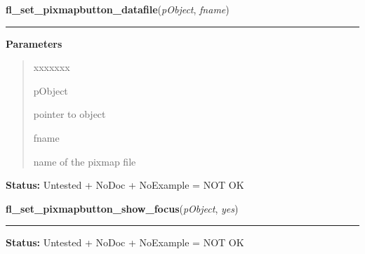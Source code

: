 \hspace{.8\funcindent}\begin{boxedminipage}{\funcwidth}

    \raggedright \textbf{fl\_set\_pixmapbutton\_datafile}(\textit{pObject}, \textit{fname})

    \vspace{-1.5ex}

    \rule{\textwidth}{0.5\fboxrule}
\setlength{\parskip}{2ex}
\setlength{\parskip}{1ex}
      \textbf{Parameters}
      \vspace{-1ex}

      \begin{quote}
        \begin{Ventry}{xxxxxxx}

          \item[pObject]

          pointer to object

          \item[fname]

          name of the pixmap file

        \end{Ventry}

      \end{quote}

\textbf{Status:} Untested + NoDoc + NoExample = NOT OK



    \end{boxedminipage}

    \label{xformslib:library:fl_set_pixmapbutton_focus_outline}

    \vspace{0.5ex}

\hspace{.8\funcindent}\begin{boxedminipage}{\funcwidth}

    \raggedright \textbf{fl\_set\_pixmapbutton\_show\_focus}(\textit{pObject}, \textit{yes})

    \vspace{-1.5ex}

    \rule{\textwidth}{0.5\fboxrule}
\setlength{\parskip}{2ex}
\setlength{\parskip}{1ex}
\textbf{Status:} Untested + NoDoc + NoExample = NOT OK



    \end{boxedminipage}


